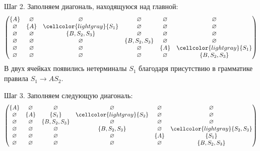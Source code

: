 \begin{example}
    Шаг 2.
    Заполняем диагональ, находящуюся над главной:
    \[
        \begin{pmatrix}
            \{A\}       & \varnothing & \varnothing                  & \varnothing     & \varnothing & \varnothing                  \\
            \varnothing & \{A\}       & \cellcolor{lightgray}\{S_1\} & \varnothing     & \varnothing & \varnothing                  \\
            \varnothing & \varnothing & \{B, S_2, S_3\}              & \varnothing     & \varnothing & \varnothing                  \\
            \varnothing & \varnothing & \varnothing                  & \{B, S_2, S_3\} & \varnothing & \varnothing                  \\
            \varnothing & \varnothing & \varnothing                  & \varnothing     & \{A\}       & \cellcolor{lightgray}\{S_1\} \\
            \varnothing & \varnothing & \varnothing                  & \varnothing     & \varnothing & \{B, S_2, S_3\}
        \end{pmatrix}
    \]
    В двух ячейках появились нетерминалы $S_1$ благодаря присутствию в грамматике правила $S_1 \to A S_2$.

    Шаг 3.
    Заполняем следующую диагональ:
    \[
        \begin{pmatrix}
            \{A\}       & \varnothing & \varnothing     & \varnothing                  & \varnothing & \varnothing                       \\
            \varnothing & \{A\}       & \{S_1\}         & \cellcolor{lightgray}\{S_2\} & \varnothing & \varnothing                       \\
            \varnothing & \varnothing & \{B, S_2, S_3\} & \varnothing                  & \varnothing & \varnothing                       \\
            \varnothing & \varnothing & \varnothing     & \{B, S_2, S_3\}              & \varnothing & \cellcolor{lightgray}\{S_2, S_3\} \\
            \varnothing & \varnothing & \varnothing     & \varnothing                  & \{A\}       & \{S_1\}                           \\
            \varnothing & \varnothing & \varnothing     & \varnothing                  & \varnothing & \{B, S_2, S_3\}
        \end{pmatrix}
    \]


\end{example}
